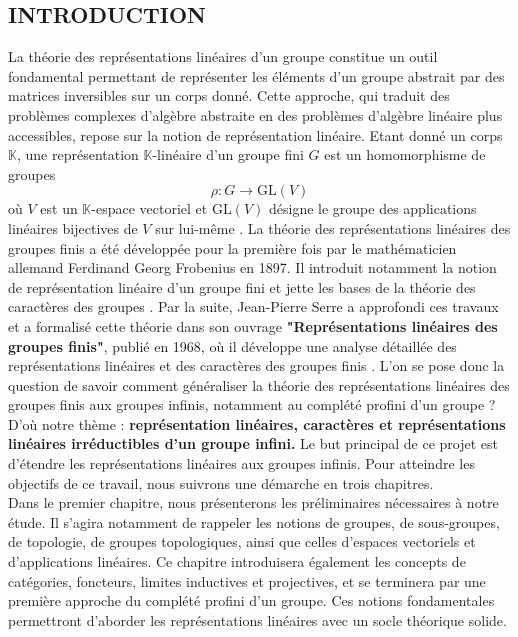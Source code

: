 \documentclass[a4paper, 14pt]{report}
\newcommand{\applyfontsize}{%
	\fontsize{12}{12}\selectfont
}
\begin{document}
\begin{onehalfspace}
\chapter*{INTRODUCTION}
{
	\applyfontsize %
La théorie des représentations linéaires d’un groupe constitue un outil fondamental permettant de représenter les éléments d’un groupe abstrait par des matrices inversibles sur un corps donné. Cette approche, qui traduit des problèmes complexes d’algèbre abstraite en des problèmes d’algèbre linéaire plus accessibles, repose sur la notion de représentation linéaire. Etant donné un corps $\mathbb{K}$, une représentation $\mathbb{K}$-linéaire d’un groupe fini $G$ est un homomorphisme de groupes \[ \rho : G \to \text{GL}(V) \]
où $V$ est un $\mathbb{K}$-espace vectoriel et $\text{GL}(V)$ désigne le groupe des applications linéaires bijectives de $V$ sur lui-même \cite{serre1971representation}. 
La théorie des représentations linéaires des groupes finis a été développée pour la première fois par le mathématicien allemand Ferdinand Georg Frobenius en 1897. Il introduit notamment la notion de représentation linéaire d’un groupe fini et jette les bases de la théorie des caractères des groupes \cite{minkowski1911gesammelte}. Par la suite, Jean-Pierre Serre a approfondi ces travaux et a formalisé cette théorie dans son ouvrage \textbf{"Représentations linéaires des groupes finis"}, publié en 1968, où il développe une analyse détaillée des représentations linéaires et des caractères des groupes finis \cite{serre1971representation}. L'on se pose donc la question de savoir comment généraliser la théorie des représentations linéaires des groupes finis aux groupes infinis, notamment au complété profini d'un groupe ? D'où notre thème : \textbf{représentation linéaires, caractères et représentations linéaires irréductibles d'un groupe infini.}
Le but principal de ce projet est d’étendre les représentations linéaires aux groupes infinis.
Pour atteindre les objectifs de ce travail, nous suivrons une démarche en trois chapitres.\\
Dans le premier chapitre, nous présenterons les préliminaires nécessaires à notre étude. Il s’agira notamment de rappeler les notions de groupes, de sous-groupes, de topologie, de groupes topologiques, ainsi que celles d’espaces vectoriels et d’applications linéaires. Ce chapitre introduisera également les concepts de catégories, foncteurs, limites inductives et projectives, et se terminera par une première approche du complété profini d’un groupe. Ces notions fondamentales permettront d’aborder les représentations linéaires avec un socle théorique solide.\\
}
\end{onehalfspace}
\end{document}
